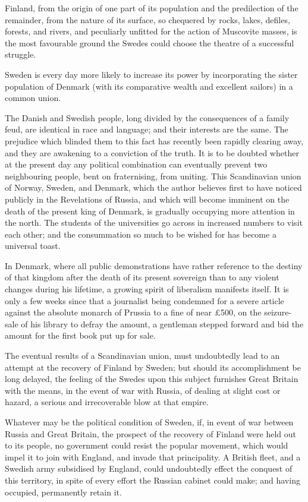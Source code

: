 \documentclass[10pt,a4paper]{article}
\begin{document}
Finland, from the origin of one part of its population and the predilection of the remainder, from the nature of its surface, so chequered by rocks, lakes, defiles, forests, and rivers, and peculiarly unfitted for the action of Muscovite masses, is the most favourable ground the Swedes could choose the theatre of a successful struggle.

Sweden is every day more likely to increase its power by incorporating the sister population of Denmark (with its comparative wealth and excellent sailors) in a common union.

The Danish and Swedish people, long divided by the consequences of a family feud, are identical in race and language; and their interests are the same. The prejudice which blinded them to this fact has recently been rapidly clearing away, and they are awakening to a conviction of the truth. It is to be doubted whether at the present day any political combination can eventually prevent two neighbouring people, bent on fraternising, from uniting. This Scandinavian union of Norway, Sweden, and Denmark, which the author believes first to have noticed publicly in the Revelations of Russia, and which will become imminent on the death of the present king of Denmark, is gradually occupying more attention in the north. The students of the universities go across in increased numbers to visit each other; and the consummation so much to be wished for has become a universal toast.

In Denmark, where all public demonstrations have rather reference to the destiny of that kingdom after the death of its present sovereign than to any violent changes during his lifetime, a growing spirit of liberalism manifests itself. It is only a few weeks since that a journalist being condemned for a severe article against the absolute monarch of Prussia to a fine of near £500, on the seizure-sale of his library to defray the amount, a gentleman stepped forward and bid the amount for the first book put up for sale.

The eventual results of a Scandinavian union, must undoubtedly lead to an attempt at the recovery of Finland by Sweden; but should its accomplishment be long delayed, the feeling of the Swedes upon this subject furnishes Great Britain with the means, in the event of war with Russia, of dealing at slight cost or hazard, a serious and irrecoverable blow at that empire.

Whatever may be the political condition of Sweden, if, in event of war between Russia and Great Britain, the prospect of the recovery of Finland were held out to its people, no government could resist the popular movement, which would impel it to join with England, and invade that principality. A British fleet, and a Swedish army subsidised by England, could undoubtedly effect the conquest of this territory, in spite of every effort the Russian cabinet could make; and having occupied, permanently retain it.
\end{document}
